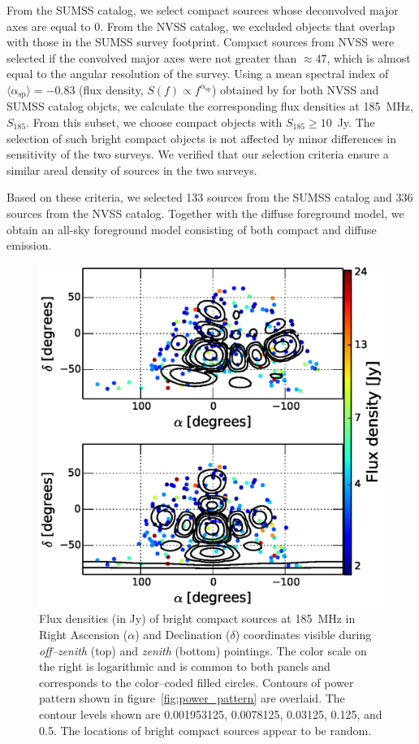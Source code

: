 \documentclass[preprint2,iop,numberedappendix]{emulateapj}
\begin{document}
From the SUMSS catalog, we select compact sources whose deconvolved major axes are equal to 0. From the NVSS catalog, we excluded objects that overlap with those in the SUMSS survey footprint. Compact sources from NVSS were selected if the convolved major axes were not greater than $\approx 47$\arcsec, which is almost equal to the angular resolution of the survey. Using a mean spectral index of $\langle\alpha_\textrm{sp}\rangle=-0.83$ (flux density, $S(f)\propto f^{\alpha_\textrm{sp}}$) obtained by \citet{mau03} for both NVSS and SUMSS catalog objcts, we calculate the corresponding flux densities at 185~MHz, $S_{185}$. From this subset, we choose compact objects with $S_{185}\geq 10$~Jy. The selection of such bright compact objects is not affected by minor differences in sensitivity of the two surveys. We verified that our selection criteria ensure a similar areal density of sources in the two surveys. 

Based on these criteria, we selected 133 sources from the SUMSS catalog and 336 sources from the NVSS catalog. Together with the diffuse foreground model, we obtain an all-sky foreground model consisting of both compact and diffuse emission.

\begin{figure}[htb]
\centering
\includegraphics[width=\linewidth]{figures/v1_0/csm.eps}
\caption{Flux densities (in Jy) of bright compact sources at 185~MHz in Right Ascension ($\alpha$) and Declination ($\delta$) coordinates visible during {\it off--zenith} (top) and {\it zenith} (bottom) pointings. The color scale on the right is logarithmic and is common to both panels and corresponds to the color--coded filled circles. Contours of power pattern shown in figure~\ref{fig:power_pattern} are overlaid. The contour levels shown are 0.001953125, 0.0078125, 0.03125, 0.125, and 0.5. The locations of bright compact sources appear to be random.\label{fig:CSM}}
\end{figure}
\end{document}
